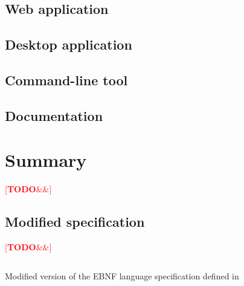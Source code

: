 \documentclass[english,engineering]{wizthesis}
\newcommand{\todo}[1]{%
  \textcolor{red}{[\textbf{TODO}\ifx&#1&{}\else{ }\fi\emph{#1}]}%
}
\begin{document}
\section{Web application}

\section{Desktop application}

\section{Command-line tool}

\section{Documentation}

{\backmatter %
\chapter{Summary}

\todo{}
}



\listoffigures

\listoftables

\listoflistings

\begin{appendices}

\chapter{Modified specification} \label{ch:modified-spec}

\todo{}

\begin{listing}[H]
  \inputminted[fontsize=\small,frame=single,breaklines,linenos]
    {lexers/ebnf_lexer.py:EbnfLexer -x}{listings/specification.ebnf}
  \caption{Modified version of the EBNF language specification defined in
  \cite{iso-14977}}
  \label{lst:specification}
\end{listing}

\end{appendices}
\end{document}
